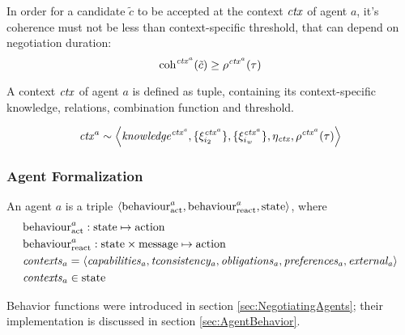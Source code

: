 \noindent
In order for a candidate $\tilde c$ to be accepted at the context $\mathit{ctx}$
of agent $a$, it's coherence must not be less than context-specific threshold,
that can depend on negotiation duration:
$$ \mathrm{coh}^{\mathit{ctx}^a}(\tilde c) \geq \rho^{\mathit{ctx}^a}(\tau) $$

\bigskip

\noindent
A context $\mathit{ctx}$ of agent $a$ is defined as tuple, containing its
context-specific knowledge, relations, combination function and threshold.

$$ \mathit{ctx}^a \sim \left< \mathit{knowledge^{\mathit{ctx}^a}},
                      \{\xi_{i_2}^{\mathit{ctx}^a}\},
                      \{\xi_{i_w}^{\mathit{ctx}^a}\},
                      \eta_{\mathit{ctx}},
                      \rho^{\mathit{ctx}^a}(\tau)
               \right> $$





\subsubsection{Agent Formalization}

\noindent
An agent $a$ is a triple $\left< \mathrm{behaviour}_{\mathrm{act}}^a,
                                 \mathrm{behaviour}_{\mathrm{react}}^a,
                                 \mathrm{state}
                          \right>$, where
\begin{align*}
  &\mathrm{behaviour}_{\mathrm{act}}^a   : \mathrm{state} \mapsto \mathrm{action} \\
  &\mathrm{behaviour}_{\mathrm{react}}^a : \mathrm{state} \times \mathrm{message} \mapsto \mathrm{action} \\
  &\mathit{contexts}_a = \left< \mathit{capabilities_a},
                                \mathit{tconsistency_a},
                                \mathit{obligations_a},
                                \mathit{preferences_a},
                                \mathit{external_a}
                           \right>\\
  &\mathit{contexts}_a \in \mathrm{state}
\end{align*}

Behavior functions were introduced in section \ref{sec:NegotiatingAgents};
their implementation is discussed in section \ref{sec:AgentBehavior}.

\todo{}



